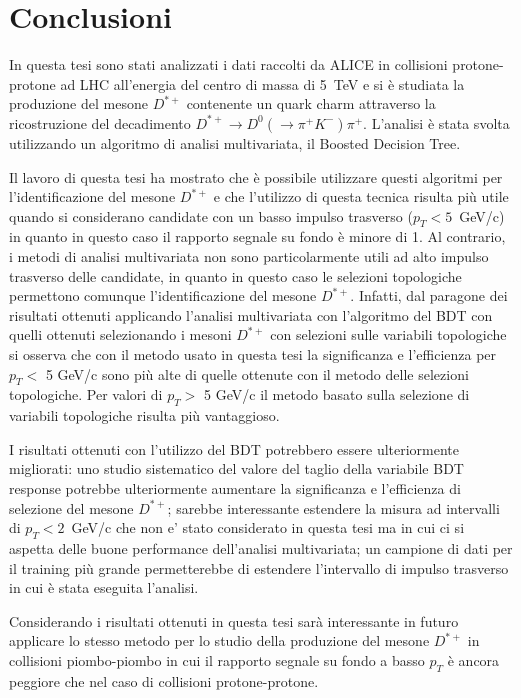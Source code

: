 \chapter{Conclusioni}

In questa tesi sono stati analizzati i dati raccolti da ALICE in collisioni protone-protone ad LHC all'energia del centro di massa di 5~TeV e si è studiata la produzione del mesone $D^{*+}$ contenente un quark charm attraverso la ricostruzione del decadimento $D^{*+} \rightarrow D^{0}(\rightarrow \pi^+ K^-)\pi^+$. L'analisi è stata svolta utilizzando un algoritmo di analisi multivariata, il Boosted Decision Tree.

Il lavoro di questa tesi ha mostrato che \`e possibile utilizzare questi algoritmi per l'identificazione del mesone $D^{*+}$ e che l'utilizzo di questa tecnica risulta pi\`u utile quando si considerano candidate con un basso impulso trasverso ($p_T < 5 $~GeV/c) in quanto in questo caso il rapporto segnale su fondo \`e minore di 1. Al contrario, i metodi di analisi multivariata non sono particolarmente utili ad alto impulso trasverso delle candidate, in quanto in questo caso le selezioni topologiche permettono comunque l'identificazione del mesone $D^{*+}$. Infatti, dal paragone dei risultati ottenuti applicando l'analisi multivariata con l'algoritmo del BDT con quelli ottenuti selezionando i mesoni $D^{*+}$ con selezioni sulle variabili topologiche si osserva che con il metodo usato in questa tesi la significanza e l'efficienza per $p_T <$ 5 GeV/c sono pi\`u alte di quelle ottenute con il metodo delle selezioni topologiche. Per valori di $p_T >$ 5 GeV/c il metodo basato sulla selezione di variabili topologiche risulta pi\`u vantaggioso.

I risultati ottenuti con l'utilizzo del BDT potrebbero essere ulteriormente migliorati: uno studio sistematico del valore del taglio della variabile BDT response potrebbe ulteriormente aumentare la significanza e l'efficienza di selezione del mesone $D^{*+}$; sarebbe interessante estendere la misura ad intervalli di $p_T < 2$~GeV/c che non e' stato considerato in questa tesi ma in cui ci si aspetta delle buone performance dell'analisi multivariata; un campione di dati per il training pi\`u grande permetterebbe di estendere l'intervallo di impulso trasverso in cui \`e stata eseguita l'analisi.

Considerando i risultati ottenuti in questa tesi sar\`a interessante in futuro applicare lo stesso metodo per lo studio della produzione del mesone $D^{*+}$ in collisioni piombo-piombo in cui il rapporto segnale su fondo a basso $p_T$ \`e ancora peggiore che nel caso di collisioni protone-protone.  

